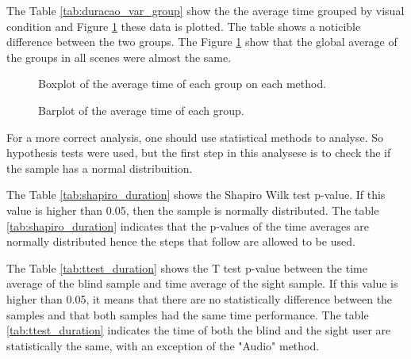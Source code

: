 



The Table \ref{tab:duracao_var_group} show the the average time grouped by visual condition and Figure \ref{fig:barplot_duration_global} these data is plotted. The table shows a noticible difference between the two groups. The Figure \ref{fig:barplot_duration_global} show that the global average of the groups in all scenes were almost the same.



\begin{figure}[!htb]
\centering
    \begin{minipage}{.45\textwidth}
        \centering
        \resizebox{0.95\linewidth}{!}{
        
        }
        \caption{Boxplot of the average time of each group on each method.}
        \label{fig:boxplot_duration_scene}
    \end{minipage}
    \hfill
    \begin{minipage}{.45\textwidth}
        \centering
        \vspace{3cm}
        \resizebox{1.1\linewidth}{!}{
        
        }
        \caption{Barplot of the average time of each group.}
        \label{fig:barplot_duration_global}
    \end{minipage}
\end{figure}

For a more correct analysis, one should use statistical methods to analyse. So hypothesis tests were used, but the first step in this analysese is to check the if the sample has a normal distribuition. 

The Table \ref{tab:shapiro_duration} shows the Shapiro Wilk test p-value. If this value is higher than 0.05, then the sample is normally distributed. The table \ref{tab:shapiro_duration} indicates that the p-values of the time averages are normally distributed hence the steps that follow are allowed to be used.



The Table \ref{tab:ttest_duration} shows the T test p-value between the time average of the blind sample and time average of the sight sample. If this value is higher than 0.05, it means that there are no statistically difference between the samples and that both samples had the same time performance. The table \ref{tab:ttest_duration} indicates the time of both the blind and the sight user are statistically the same, with an exception of the "Audio" method.


